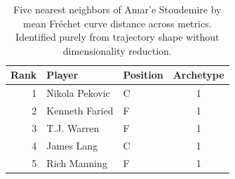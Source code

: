 \begin{table}[htbp]
  \centering\small
  \begin{tabular}{rllc}
    \toprule
    Rank & Player & Position & Archetype \\
    \midrule
    1 & Nikola Pekovic & C & 1 \\
    2 & Kenneth Faried & F & 1 \\
    3 & T.J. Warren & F & 1 \\
    4 & James Lang & C & 1 \\
    5 & Rich Manning & F & 1 \\
    \bottomrule
  \end{tabular}
  \caption{Five nearest neighbors of Amar'e Stoudemire by mean Fr\'{e}chet curve distance across metrics. Identified purely from trajectory shape without dimensionality reduction.}
  \label{tab:Amar_e_Stoudemire_frechet_curve_neighbors}
\end{table}

